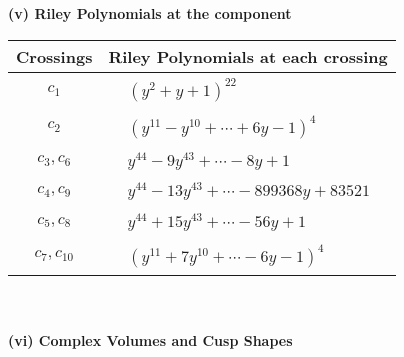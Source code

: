 \documentclass[1p]{elsarticle_modified}
\theoremstyle{definition}
\begin{document}
\newpage\renewcommand{\arraystretch}{1}
\flushleft \textbf{(v) Riley Polynomials at the component}\newline \\
\begin{tabular}{m{50pt}|m{274pt}}
Crossings & \hspace{64pt}Riley Polynomials at each crossing \\
\hline $$\begin{aligned}c_{1}\end{aligned}$$&$\begin{aligned}
&(y^2+y+1)^{22}
\end{aligned}$\\
\hline $$\begin{aligned}c_{2}\end{aligned}$$&$\begin{aligned}
&(y^{11}- y^{10}+\cdots+6 y-1)^{4}
\end{aligned}$\\
\hline $$\begin{aligned}c_{3},c_{6}\end{aligned}$$&$\begin{aligned}
&y^{44}-9 y^{43}+\cdots-8 y+1
\end{aligned}$\\
\hline $$\begin{aligned}c_{4},c_{9}\end{aligned}$$&$\begin{aligned}
&y^{44}-13 y^{43}+\cdots-899368 y+83521
\end{aligned}$\\
\hline $$\begin{aligned}c_{5},c_{8}\end{aligned}$$&$\begin{aligned}
&y^{44}+15 y^{43}+\cdots-56 y+1
\end{aligned}$\\
\hline $$\begin{aligned}c_{7},c_{10}\end{aligned}$$&$\begin{aligned}
&(y^{11}+7 y^{10}+\cdots-6 y-1)^{4}
\end{aligned}$\\
\hline
\end{tabular}\\~\\
\newpage\flushleft \textbf{(vi) Complex Volumes and Cusp Shapes}
\end{document}

